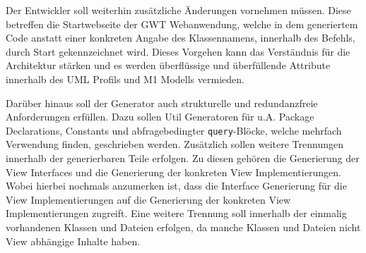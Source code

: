 Der Entwickler soll weiterhin zusätzliche Änderungen vornehmen müssen. Diese
betreffen die Startwebseite der GWT Webanwendung, welche in dem generiertem
Code anstatt einer konkreten Angabe des Klassennamens, innerhalb des Befehls,
durch \glqq{}Start\grqq{} gekennzeichnet wird. Dieses Vorgehen kann das
Verständnis für die Architektur stärken und es werden überflüssige und überfüllende
Attribute innerhalb des UML Profils und M1 Modells vermieden.

Darüber hinaus soll der Generator auch strukturelle und redundanzfreie
Anforderungen erfüllen. Dazu sollen \glqq{}Util\grqq{} Generatoren für u.A.
Package Declarations, Constants und abfragebedingter \texttt{query}-Blöcke,
welche mehrfach Verwendung finden, geschrieben werden. Zusätzlich sollen weitere
Trennungen innerhalb der generierbaren Teile erfolgen. Zu diesen gehören die
Generierung der View Interfaces und die Generierung der konkreten View Implementierungen. Wobei
hierbei nochmals anzumerken ist, dass die Interface Generierung für die View
Implementierungen auf die Generierung der konkreten View Implementierungen
zugreift. Eine weitere Trennung soll innerhalb der einmalig vorhandenen Klassen
und Dateien erfolgen, da manche Klassen und Dateien nicht View abhängige Inhalte
haben.
